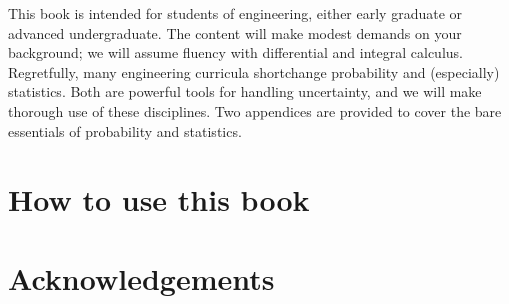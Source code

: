 \documentclass[../primer.tex]{subfiles}
\begin{document}
This book is intended for students of engineering, either early graduate or
advanced undergraduate. The content will make modest demands on your background;
we will assume fluency with differential and integral calculus. Regretfully,
many engineering curricula shortchange probability and (especially) statistics.
Both are powerful tools for handling uncertainty, and we will make thorough use
of these disciplines. Two appendices are provided to cover the bare essentials
of probability and statistics.

\section{How to use this book}

\section{Acknowledgements}
\end{document}
